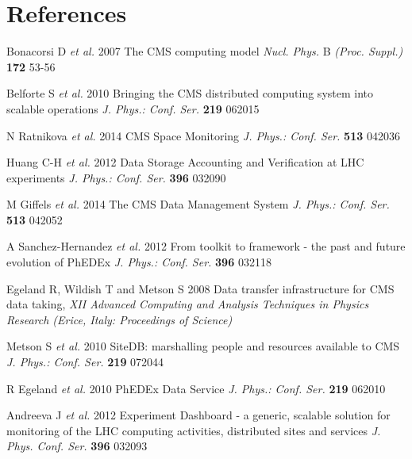 \section*{References}

\begin{thebibliography}{1}

 Bonacorsi D {\it et al.} 2007 The CMS computing model 
{\it Nucl. Phys.} B {\it (Proc. Suppl.)} {\bf 172} 53-56

 Belforte S {\it et al.} 2010 Bringing the CMS distributed computing system into scalable operations 
{\it J. Phys.: Conf. Ser.} {\bf 219} 062015

N Ratnikova {\it et al.} 2014 CMS Space Monitoring {\it J. Phys.: Conf. Ser.} {\bf 513} 042036 

Huang C-H {\it et al.} 2012 Data Storage Accounting and Verification at LHC experiments 
{\it J. Phys.: Conf. Ser.} {\bf 396} 032090

M Giffels {\it et al.} 2014 The CMS Data Management System {\it J. Phys.: Conf. Ser.} {\bf 513} 042052

A Sanchez-Hernandez {\it et al.} 2012 From toolkit to framework - the past and future evolution of PhEDEx  
{\it J. Phys.: Conf. Ser.} {\bf 396} 032118 

  Egeland R, Wildish T and Metson S 2008 Data transfer infrastructure for CMS data taking,  
{\it XII Advanced Computing and Analysis Techniques in Physics Research (Erice, Italy: Proceedings of Science)}



Metson S {\it et al.} 2010 SiteDB: marshalling people and resources available to CMS
{\it J. Phys.: Conf. Ser.} {\bf 219} 072044


 R Egeland {\it et al.} 2010  PhEDEx Data Service 
{\it J. Phys.: Conf. Ser.} {\bf 219} 062010

  Andreeva J {\it et al.} 2012 Experiment Dashboard - a generic, scalable solution for 
monitoring of the LHC computing activities, distributed sites and services 
{\it J. Phys. Conf. Ser.} {\bf 396} 032093


\end{thebibliography}
